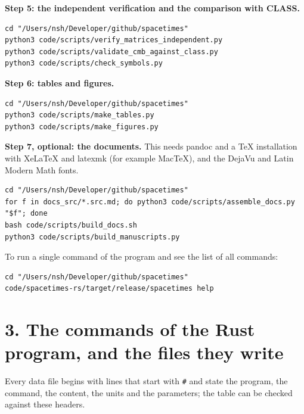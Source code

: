 \documentclass[
  10pt,
]{article}
\begin{document}
\textbf{Step 5: the independent verification and the comparison with
CLASS.}

\begin{verbatim}
cd "/Users/nsh/Developer/github/spacetimes"
python3 code/scripts/verify_matrices_independent.py
python3 code/scripts/validate_cmb_against_class.py
python3 code/scripts/check_symbols.py
\end{verbatim}

\textbf{Step 6: tables and figures.}

\begin{verbatim}
cd "/Users/nsh/Developer/github/spacetimes"
python3 code/scripts/make_tables.py
python3 code/scripts/make_figures.py
\end{verbatim}

\textbf{Step 7, optional: the documents.} This needs pandoc and a TeX
installation with XeLaTeX and latexmk (for example MacTeX), and the
DejaVu and Latin Modern Math fonts.

\begin{verbatim}
cd "/Users/nsh/Developer/github/spacetimes"
for f in docs_src/*.src.md; do python3 code/scripts/assemble_docs.py "$f"; done
bash code/scripts/build_docs.sh
python3 code/scripts/build_manuscripts.py
\end{verbatim}

To run a single command of the program and see the list of all commands:

\begin{verbatim}
cd "/Users/nsh/Developer/github/spacetimes"
code/spacetimes-rs/target/release/spacetimes help
\end{verbatim}

\hypertarget{the-commands-of-the-rust-program-and-the-files-they-write}{%
\section{3. The commands of the Rust program, and the files they
write}\label{the-commands-of-the-rust-program-and-the-files-they-write}}

Every data file begins with lines that start with \texttt{\#} and state
the program, the command, the content, the units and the parameters; the
table can be checked against these headers.
\end{document}
